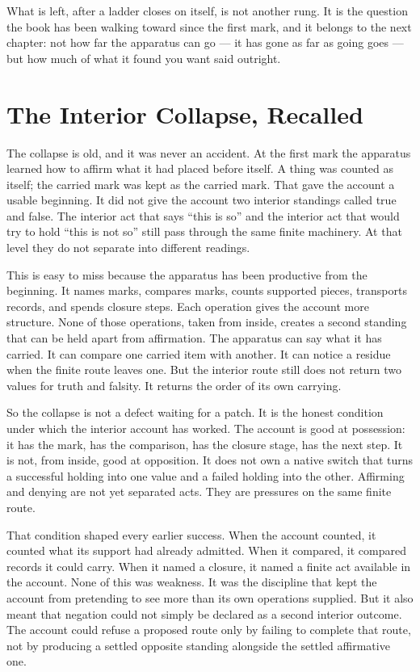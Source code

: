 What is left, after a ladder closes on itself, is not another rung. It is the question the book has been walking toward since the first mark, and it belongs to the next chapter: not how far the apparatus can go --- it has gone as far as going goes --- but how much of what it found you want said outright.

\section{The Interior Collapse, Recalled}

The collapse is old, and it was never an accident. At the first mark the apparatus learned how
to affirm what it had placed before itself. A thing was counted as itself; the carried mark was
kept as the carried mark. That gave the account a usable beginning. It did not give the account
two interior standings called true and false. The interior act that says ``this is so'' and the
interior act that would try to hold ``this is not so'' still pass through the same finite
machinery. At that level they do not separate into different readings.

This is easy to miss because the apparatus has been productive from the beginning. It names
marks, compares marks, counts supported pieces, transports records, and spends closure steps.
Each operation gives the account more structure. None of those operations, taken from inside,
creates a second standing that can be held apart from affirmation. The apparatus can say what
it has carried. It can compare one carried item with another. It can notice a residue when the
finite route leaves one. But the interior route still does not return two values for truth and
falsity. It returns the order of its own carrying.

So the collapse is not a defect waiting for a patch. It is the honest condition under which
the interior account has worked. The account is good at possession: it has the mark, has the
comparison, has the closure stage, has the next step. It is not, from inside, good at opposition.
It does not own a native switch that turns a successful holding into one value and a failed
holding into the other. Affirming and denying are not yet separated acts. They are pressures on
the same finite route.

That condition shaped every earlier success. When the account counted, it counted what its
support had already admitted. When it compared, it compared records it could carry. When it
named a closure, it named a finite act available in the account. None of this was weakness. It
was the discipline that kept the account from pretending to see more than its own operations
supplied. But it also meant that negation could not simply be declared as a second interior
outcome. The account could refuse a proposed route only by failing to complete that route, not
by producing a settled opposite standing alongside the settled affirmative one.

